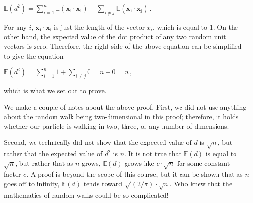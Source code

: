 \documentclass{article}
\begin{document}
\begin{center}
$\mathbb{E}(d^2) = \sum_{i=1}^n \mathbb{E}(\mathbf{x_i} \cdot \mathbf{x_i}) + \sum_{i \neq j} \mathbb{E}(\mathbf{x_i} \cdot \mathbf{x_j})\, .$
\end{center}

For any $i$, $\mathbf{x_i} \cdot \mathbf{x_i}$ is just the length of the vector $x_i$, which is equal to 1.  On the other hand, the expected value of the dot product of any two random unit vectors is zero.  Therefore, the right side of the above equation can be simplified to give the equation

\begin{center}
$\mathbb{E}(d^2) = \sum_{i=1}^n 1 + \sum_{i \neq j} 0 = n + 0 = n\, ,$
\end{center}

\noindent which is what we set out to prove.

We make a couple of notes about the above proof. First, we did not use anything about the random walk being two-dimensional in this proof; therefore, it holds whether our particle is walking in two, three, or any number of dimensions.

Second, we technically did not show that the expected value of $d$ is $\sqrt{n}$, but rather that the expected value of $d^2$ is $n$. It is not true that $\mathbb{E}(d)$ is equal to $\sqrt{n}$, but rather that as $n$ grows, $\mathbb{E}(d)$ grows like $c \cdot \sqrt{n}$ for some constant factor $c$. A proof is beyond the scope of this course, but it can be shown that as $n$ goes off to infinity, $\mathbb{E}(d)$ tends toward $\sqrt{(2/\pi)} \cdot \sqrt{n}$. Who knew that the mathematics of random walks could be so complicated!
\end{document}
